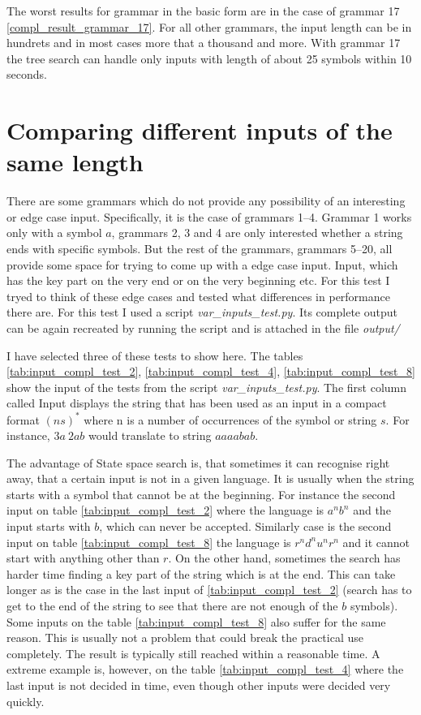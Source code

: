 The worst results for grammar in the basic form are in the case of grammar 17 \ref{compl_result_grammar_17}. For all other grammars, the input length can be in hundrets and in most cases more that a thousand and more. With grammar 17 the tree search can handle only inputs with length of about 25 symbols within 10 seconds.

\section{Comparing different inputs of the same length}
There are some grammars which do not provide any possibility of an interesting or edge case input. Specifically, it is the case of grammars 1--4. Grammar 1 works only with a symbol $a$, grammars 2, 3 and 4 are only interested whether a string ends with specific symbols. But the rest of the grammars, grammars 5--20, all provide some space for trying to come up with a edge case input. Input, which has the key part on the very end or on the very beginning etc. For this test I tryed to think of these edge cases and tested what differences in performance there are. For this test I used a script \textit{var\_inputs\_test.py}. Its complete output can be again recreated by running the script and is attached in the file \textit{output/}

I have selected three of these tests to show here. The tables \ref{tab:input_compl_test_2}, \ref{tab:input_compl_test_4}, \ref{tab:input_compl_test_8}  show the input of the tests from the script \textit{var\_inputs\_test.py}. The first column called Input displays the string that has been used as an input in a compact format $(ns)^*$ where n is a number of occurrences of the symbol or string $s$. For instance, $3a\:2ab$ would translate to string $aaaabab$.

The advantage of State space search is, that sometimes it can recognise right away, that a certain input is not in a given language. It is usually when the string starts with a symbol that cannot be at the beginning. For instance the second input on table \ref{tab:input_compl_test_2} where the language is $a^nb^n$ and the input starts with $b$, which can never be accepted. Similarly case is the second input on table \ref{tab:input_compl_test_8} the language is $r^nd^nu^nr^n$ and it cannot start with anything other than $r$.
On the other hand, sometimes the search has harder time finding a key part of the string which is at the end. This can take longer as is the case in the last input of \ref{tab:input_compl_test_2} (search has to get to the end of the string to see that there are not enough of the $b$ symbols). Some inputs on the table \ref{tab:input_compl_test_8} also suffer for the same reason. This is usually not a problem that could break the practical use completely. The result is typically still reached within a reasonable time. A extreme example is, however, on the table \ref{tab:input_compl_test_4} where the last input is not decided in time, even though other inputs were decided very quickly.

